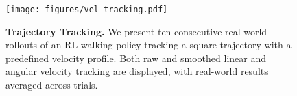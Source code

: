 \begin{figure}[t]
    \centering
    \texttt{[image: figures/vel\_tracking.pdf]}
    \caption{\textbf{Trajectory Tracking.} We present ten consecutive real-world rollouts of an RL walking policy tracking a square trajectory with a predefined velocity profile.
    Both raw and smoothed linear and angular velocity tracking are displayed, with real-world results averaged across trials.}
    \label{fig:vel_tracking}
    \vspace{-1mm}
\end{figure}

